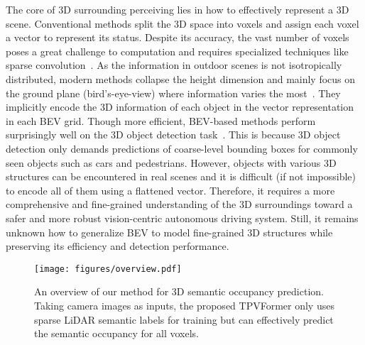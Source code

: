 \documentclass[10pt,twocolumn,letterpaper]{article}
\begin{document}
The core of 3D surrounding perceiving lies in how to effectively represent a 3D scene.
Conventional methods split the 3D space into voxels and assign each voxel a vector to represent its status.
Despite its accuracy, the vast number of voxels poses a great challenge to computation and requires specialized techniques like sparse convolution~\cite{choy20194d}.
As the information in outdoor scenes is not isotropically distributed, modern methods collapse the height dimension and mainly focus on the ground plane (bird's-eye-view) where information varies the most~\cite{bevdepth,bevfusion,bevfusion2,lss,bevdet,beverse,simmod}.
They implicitly encode the 3D information of each object in the vector representation in each BEV grid.
Though more efficient, BEV-based methods perform surprisingly well on the 3D object detection task~\cite{bevfusion,bevfusion2}.
This is because 3D object detection only demands predictions of coarse-level bounding boxes for commonly seen objects such as cars and pedestrians.
However, objects with various 3D structures can be encountered in real scenes and it is difficult (if not impossible) to encode all of them using a flattened vector.
Therefore, it requires a more comprehensive and fine-grained understanding of the 3D surroundings toward a safer and more robust vision-centric autonomous driving system.
Still, it remains unknown how to generalize BEV to model fine-grained 3D structures while preserving its efficiency and detection performance.


\begin{figure}[t]
\centering
\texttt{[image: figures/overview.pdf]}
\vspace{-7mm}
\caption{An overview of our method for 3D semantic occupancy prediction.
Taking camera images as inputs, the proposed TPVFormer only uses sparse LiDAR semantic labels for training but can effectively predict the semantic occupancy for all voxels.
}
\label{fig:overview}
\vspace{-7mm}
\end{figure}
\end{document}
